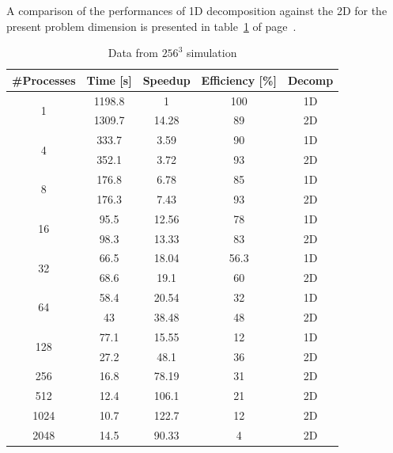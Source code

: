 \par
A comparison of the performances of 1D decomposition against the 2D for the present problem dimension is presented in table~\ref{128:data} of page~\pageref{128:data}.

\begin{table}
\caption{Data from $256^{3}$ simulation}
\begin{center}
\begin{tabular}{c c c c c}
\toprule
\textbf{\#Processes} & \textbf{Time [s]} & \textbf{Speedup} & \textbf{Efficiency [\%]} & \textbf{Decomp}\\
\midrule
\multirow{2}{*}{1} &  1198.8 & 1 & 100 & 1D\\
& 1309.7 & 14.28 & 89 & 2D\\
\hline
\multirow{2}{*}{4} &  333.7 & 3.59 & 90 & 1D\\
& 352.1 & 3.72 & 93 & 2D \\
\hline
\multirow{2}{*}{8} &  176.8 & 6.78 & 85 & 1D\\
& 176.3 & 7.43 & 93 & 2D\\
\hline
\multirow{2}{*}{16} & 95.5 & 12.56 & 78 & 1D\\
& 98.3 & 13.33 & 83 & 2D\\
\hline
\multirow{2}{*}{32} & 66.5 & 18.04 & 56.3 & 1D\\
& 68.6 & 19.1 & 60 & 2D\\
\hline
\multirow{2}{*}{64} & 58.4 & 20.54 & 32 & 1D\\
& 43 & 38.48 & 48 & 2D\\
\hline 
\multirow{2}{*}{128} & 77.1 & 15.55 & 12 & 1D\\
& 27.2 & 48.1 & 36 & 2D\\
\hline
256 & 16.8 & 78.19 & 31 & 2D\\
512 & 12.4 & 106.1 & 21 & 2D\\
1024 & 10.7 & 122.7 & 12 & 2D\\
2048 & 14.5 & 90.33 & 4 & 2D\\
\bottomrule
\end{tabular}
\end{center}
\label{128:data}
\end{table}


